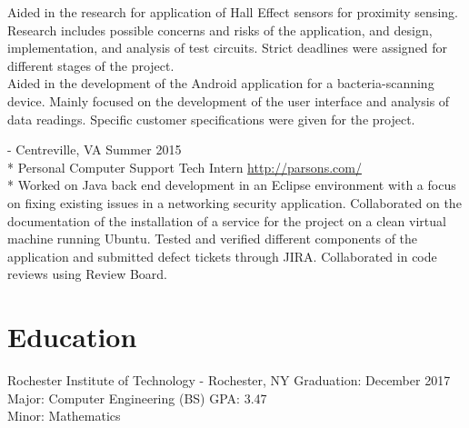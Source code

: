 \documentclass[a4paper,margin,line]{resume}
\newcommand{\rurl}[1]{\hfill {\footnotesize \url{#1}}}
\newcommand{\rdate}[1]{\hfill {\small #1}}
\renewcommand{\employer}[5]{ \item[#1] - #2 \rdate{#3} \\* #4 \rurl{#5} \\*}
\begin{document}
\begin{resume}
\begin{asparadesc}
        Aided in the research for application of Hall Effect sensors for proximity sensing.  
        Research includes possible concerns and risks of the application, and design, implementation, and analysis of 
        test circuits.  Strict deadlines were assigned for different stages of the project.\medskip\\
        Aided in the development of the Android application for a bacteria-scanning device.  Mainly focused on the development of the user 
        interface and analysis of data readings.  Specific customer specifications were given for the project. 
        \\
        \employer{Parsons Government Services}{Centreville, VA}{Summer 2015}{Personal Computer Support Tech Intern}
        {http://parsons.com/}
        \small
        Worked on Java back end development in an Eclipse environment with a focus on fixing existing 
        issues in a networking security application. Collaborated on the documentation of the installation 
        of a service for the project on a clean virtual machine running Ubuntu. Tested and verified 
        different components of the application and submitted defect tickets through JIRA.  Collaborated 
        in code reviews using Review Board.
        \normalsize
        
    \end{asparadesc}


\section{\mysidestyle Education}
    \begin{compactdesc}
        \item[Rochester Institute of Technology] - Rochester, NY \rdate{Graduation: December 2017} \\
            Major: Computer Engineering (BS) \rdate{GPA: 3.47}\\
            Minor: Mathematics
    \end{compactdesc}



\end{resume}
\end{document}
